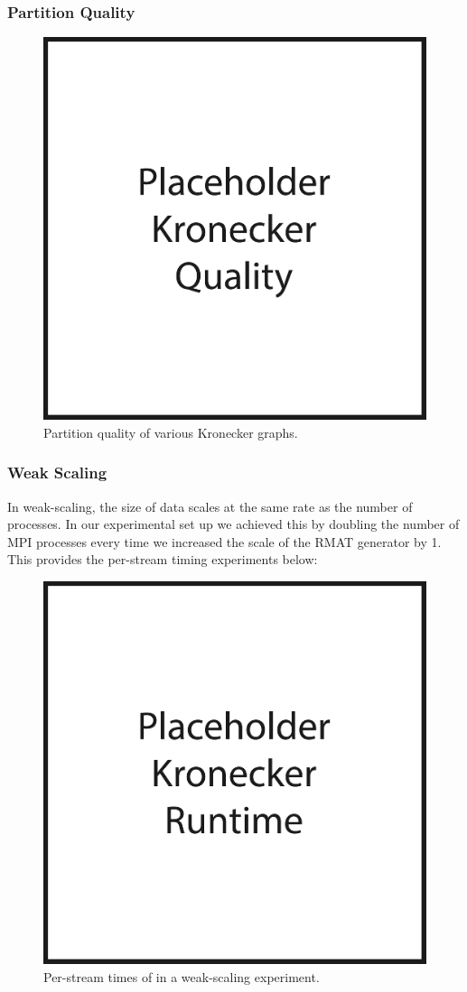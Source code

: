 \subsubsection{Partition Quality}
\begin{figure}[h!]
\centering
  \includegraphics[width=0.8\columnwidth]{figures/kronecker_quality_tests.pdf}
  \caption{Partition quality of various Kronecker graphs.}
  \label{fig:kronqual}
\end{figure}


\subsubsection{Weak Scaling}
In weak-scaling, the size of data scales at the same rate as the number of processes. In our experimental set up we achieved this by doubling the number of MPI processes every time we increased the scale of the RMAT generator by 1. This provides the per-stream timing experiments below:
\begin{figure}[h!]
\centering
  \includegraphics[width=0.8\columnwidth]{figures/kronecker_speed_tests.pdf}
  \caption{Per-stream times of \ourmethod in a weak-scaling experiment.}
  \label{fig:kronspeed}
\end{figure}


